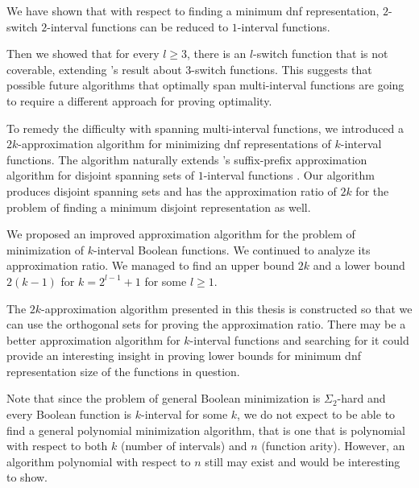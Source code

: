 
We have shown that
with respect to finding
a minimum \acrshort{dnf} representation,
$2$-switch $2$-interval functions
can be reduced to $1$-interval functions.

Then we showed that for every $l \geq 3$,
there is an $l$-switch function that is not coverable,
extending \citeauthor{Dubovsky2012}'s result
about $3$-switch functions.
This suggests that possible future algorithms
that optimally span multi-interval functions
are going to require a different approach
for proving optimality.

To remedy the difficulty with spanning multi-interval
functions,
we introduced a $2k$-approximation algorithm
for minimizing \acrshort{dnf} representations
of $k$-interval functions.
The algorithm naturally extends
\citeauthor{Schieber2005154}'s suffix-prefix
approximation algorithm
for disjoint spanning sets of $1$-interval functions
\citep[section 6]{Schieber2005154}.
Our algorithm produces disjoint spanning sets
and has the approximation ratio of $2k$
for the problem of finding
a minimum disjoint representation as well.

We proposed an improved approximation algorithm for the problem of minimization of $k$-interval Boolean functions.
We continued to analyze its approximation ratio.
We managed to find an upper bound $2k$ and a lower bound $2(k-1)$
for $k = 2^{l-1}+1$ for some $l \geq 1$.

The $2k$-approximation algorithm presented in this thesis
is constructed so that we can use the orthogonal sets
for proving the approximation ratio.
There may be a better approximation algorithm
for $k$-interval functions
and searching for it could provide an interesting insight
in proving lower bounds for minimum \acrshort{dnf}
representation size of the functions in question.


Note that since the problem
of general Boolean minimization
is $\Sigma_2$-hard \citep{Umans1998}
and every Boolean function is $k$-interval for some $k$,
we do not expect to be able to find
a general polynomial minimization algorithm,
that is one that is polynomial
with respect to both $k$ (number of intervals) and $n$ (function arity).
However,
an algorithm polynomial with respect to $n$ still may exist and would be interesting to show.

